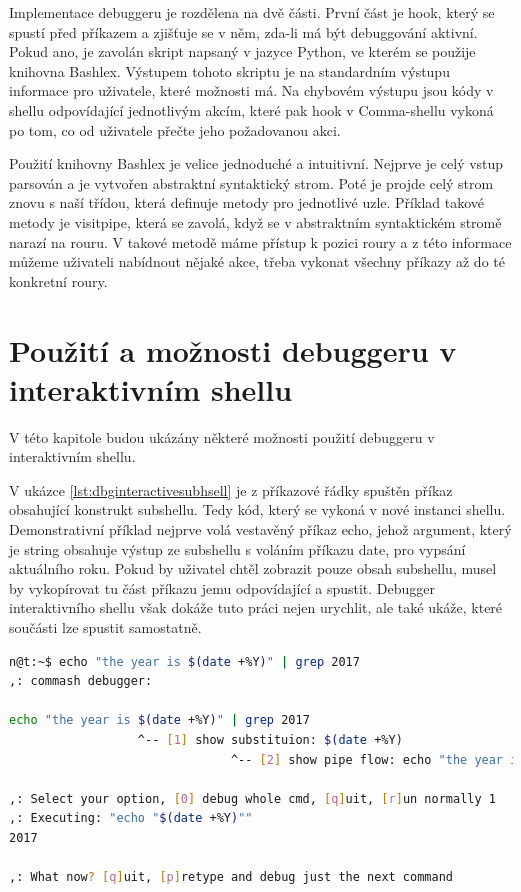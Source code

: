 \documentclass[thesis=M,czech]{FITthesis}[2012/06/26]
\begin{document}
Implementace debuggeru je rozdělena na dvě části. První část je hook, který se spustí před příkazem a zjišťuje se v něm, zda-li má být debuggování aktivní. Pokud ano, je zavolán skript napsaný v jazyce Python, ve kterém se použije knihovna Bashlex. Výstupem tohoto skriptu je na standardním výstupu informace pro uživatele, které možnosti má. Na chybovém výstupu jsou kódy v shellu odpovídající jednotlivým akcím, které pak hook v Comma-shellu vykoná po tom, co od uživatele přečte jeho požadovanou akci.

Použití knihovny Bashlex je velice jednoduché a intuitivní. Nejprve je celý vstup parsován a je vytvořen abstraktní syntaktický strom. Poté je projde celý strom znovu s naší třídou, která definuje metody pro jednotlivé uzle. Příklad takové metody je visitpipe, která se zavolá, když se v abstraktním syntaktickém stromě narazí na rouru. V takové metodě máme přístup k pozici roury a z této informace můžeme uživateli nabídnout nějaké akce, třeba vykonat všechny příkazy až do té konkretní roury.


\section{Použití a možnosti debuggeru v interaktivním shellu}

V této kapitole budou ukázány některé možnosti použití debuggeru v interaktivním shellu.

V ukázce \ref{lst:dbginteractivesubhsell} je z příkazové řádky spuštěn příkaz obsahující konstrukt subshellu. Tedy kód, který se vykoná v nové instanci shellu. Demonstrativní příklad nejprve volá vestavěný příkaz echo, jehož argument, který je string obsahuje výstup ze subshellu s voláním příkazu date, pro vypsání aktuálního roku. Pokud by uživatel chtěl zobrazit pouze obsah subshellu, musel by vykopírovat tu část příkazu jemu odpovídající a spustit. Debugger interaktivního shellu však dokáže tuto práci nejen urychlit, ale také ukáže, které součásti lze spustit samostatně.

\begin{minipage}{\linewidth}
\begin{lstlisting}[language=bash, caption={Debugger interaktivního shellu - subshell}, label={lst:dbginteractivesubhsell}]
n@t:~$ echo "the year is $(date +%Y)" | grep 2017
,: commash debugger:

echo "the year is $(date +%Y)" | grep 2017
                  ^-- [1] show substituion: $(date +%Y)
                               ^-- [2] show pipe flow: echo "the year is $(date +%Y)" 

,: Select your option, [0] debug whole cmd, [q]uit, [r]un normally 1
,: Executing: "echo "$(date +%Y)""
2017

,: What now? [q]uit, [p]retype and debug just the next command
\end{lstlisting}
\end{minipage}
\end{document}
